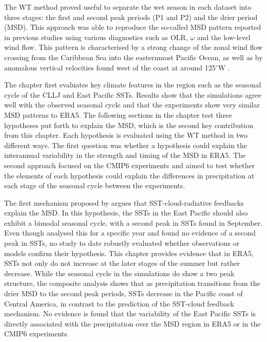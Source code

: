 The WT method proved useful to separate the wet season in each dataset into three stages: the first and second peak periods (P1 and P2) and the drier period (MSD). 
This approach was able to reproduce the so-called MSD pattern reported in previous studies \citep{zermeno2019,zhao2020} using various diagnostics such as OLR, $\omega$ and the low-level wind flow. This pattern is characterised by a strong change of the zonal wind flow crossing from the Caribbean Sea into the easternmost Pacific Ocean, as well as by anomalous vertical velocities found west of the coast at around 125$^\circ$W \citep{herrera2015,zermeno2019}. 

The chapter first evaluates key climate features in the region such as the seasonal cycle of the CLLJ and East Pacific SSTs. Results show that the simulations agree well with the observed seasonal cycle and that the experiments show very similar MSD patterns to ERA5. 
The following sections in the chapter test three hypotheses put forth to explain the MSD, which is the second key contribution from this chapter.
 Each hypothesis is evaluated using the WT method in two different ways. The first question was whether a hypothesis could explain  the interannual variability in the strength and timing of the MSD  in ERA5. The second approach focused on the CMIP6 experiments and aimed to test whether the elements of each hypothesis could explain the differences in precipitation at each stage of the seasonal cycle between the experiments.
 
 The first mechanism proposed by \cite{magana1999} argues that SST-cloud-radiative feedbacks explain the MSD. In this hypothesis, the SSTs in the East Pacific should also exhibit a bimodal seasonal cycle, with a second peak in SSTs found in September. Even though \cite{magana2005} analysed this for a specific year and found no evidence of a second peak in SSTs, no study to date robustly evaluated whether observations or models confirm their hypothesis. This chapter provides evidence that in ERA5, SSTs not only do not increase at the later stages of the summer but rather decrease. While the seasonal cycle in the simulations do show a two peak structure, the composite analysis shows that as precipitation transitions from the drier MSD to the second peak periods, SSTs decrease in the Pacific coast of Central America, in contrast to the prediction of the SST-cloud feedback mechanism. No evidence is found that the variability of the East Pacific SSTs is directly associated with the precipitation over the MSD region in ERA5 or in the CMIP6 experiments. 

